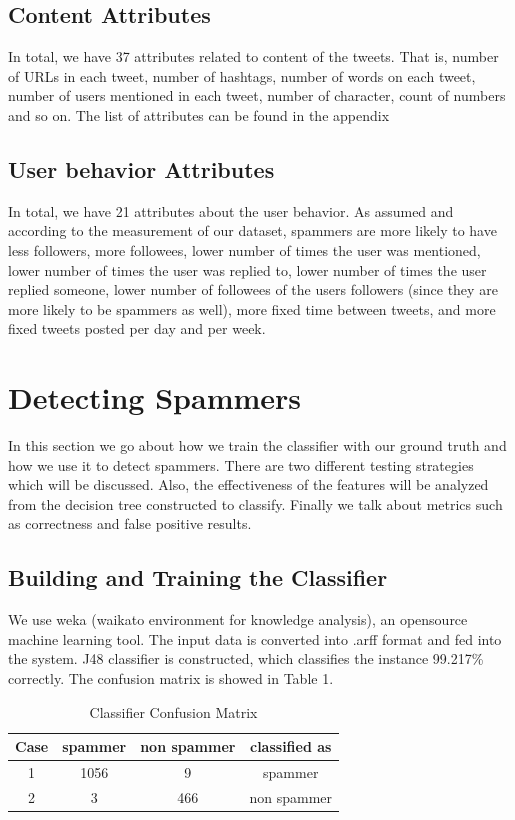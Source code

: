 \documentclass[11pt]{article}
\begin{document}
\subsection{Content Attributes}
  In total, we have 37 attributes related to content of the tweets. That is, number of URLs in each tweet, number of hashtags, number of words on each tweet, number of users mentioned in each tweet, number of character, count of numbers and so on. The list of attributes can be found in the appendix
\subsection{User behavior Attributes}
 In total, we have 21 attributes about the user behavior. As assumed and according to the measurement of our dataset, spammers are more likely to have less followers, more followees, lower number of times the user was mentioned, lower number of times the user was replied to, lower number of times the user replied someone, lower number of followees of the users followers (since they are more likely to be spammers as well), more fixed time between tweets, and more fixed tweets posted per day and per week.


\section{Detecting Spammers}

In this section we go about how we train the classifier with our ground truth and how we use it to detect spammers. There are two different testing strategies which will be discussed. Also, the effectiveness of the features will be analyzed from the decision tree constructed to classify. Finally we talk about metrics such as correctness and false positive results.

\subsection{Building and Training the Classifier}
We use weka (waikato environment for knowledge analysis), an opensource machine learning tool. The input data is converted into .arff format and fed into the system. J48 classifier is constructed, which classifies the instance 99.217\% correctly. The confusion matrix is showed in Table 1.

\begin{table}[ht] 
\caption{Classifier Confusion Matrix} %
\centering %
\begin{tabular}{c c c c} %
\hline\hline %
Case & spammer & non spammer & classified as \\ [0.5ex] %
\hline %
1 & 1056 & 9 & spammer \\ %
2 & 3 & 466 & non spammer \\ [1ex] %
\hline %
\end{tabular} 
\label{table:nonlin} %
\end{table}
\end{document}
